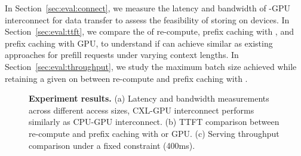 In Section~\ref{sec:eval:connect}, we measure the latency and bandwidth of \cxl-GPU interconnect for data transfer to assess the feasibility of storing \kvcache on \cxl devices.
In Section~\ref{sec:eval:ttft}, we compare the \ttft of \kv re-compute, prefix caching with \cxl, and prefix caching with GPU, to understand if \tool can achieve similar \ttft as existing approaches for prefill requests under varying context lengths.
In Section~\ref{sec:eval:throughput}, we study the maximum batch size achieved while retaining a given \slo on \ttft between \kv re-compute and prefix caching with \cxl.


\begin{figure}[ht!]
    \centering
    \vspace{-1em}
    \caption{\textbf{Experiment results.} (a) Latency and bandwidth measurements across different access sizes, CXL-GPU interconnect performs similarly as CPU-GPU interconnect. (b) TTFT comparison between \kv re-compute and prefix caching with \cxl or GPU. (c) Serving throughput comparison under a fixed \slo constraint (400ms).} 
    \label{fig:evaluation}%
\end{figure}


